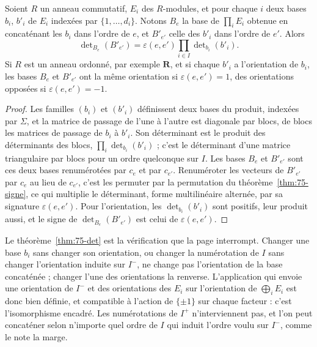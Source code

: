 \begin{encadre}
\begin{theoreme}\label{thm:75-det}
Soient $R$ un anneau commutatif, $E_i$ des $R$-modules, et pour chaque $i$ deux bases $b_i$, $b'_i$ de $E_i$ indexées par $\{1, \ldots, d_i\}$. Notons $B_e$ la base de $\prod_i E_i$ obtenue en concaténant les $b_i$ dans l'ordre de $e$, et $B'_{e'}$ celle des $b'_i$ dans l'ordre de $e'$. Alors
\[
\det\nolimits_{B_e}(B'_{e'}) = \varepsilon(e, e') \prod_{i \in I} \det\nolimits_{b_i}(b'_i) .
\]
Si $R$ est un anneau ordonné, par exemple $\mathbf R$, et si chaque $b'_i$ a l'orientation de $b_i$, les bases $B_e$ et $B'_{e'}$ ont la même orientation si $\varepsilon(e, e') = 1$, des orientations opposées si $\varepsilon(e, e') = -1$.
\end{theoreme}
\end{encadre}

\begin{proof}
Les familles $(b_i)$ et $(b'_i)$ définissent deux bases du produit, indexées par $\Sigma$, et la matrice de passage de l'une à l'autre est diagonale par blocs, de blocs les matrices de passage de $b_i$ à $b'_i$. Son déterminant est le produit des déterminants des blocs, $\prod_i \det_{b_i}(b'_i)$ ; c'est le déterminant d'une matrice triangulaire par blocs pour un ordre quelconque sur $I$. Les bases $B_e$ et $B'_{e'}$ sont ces deux bases renumérotées par $c_e$ et par $c_{e'}$. Renuméroter les vecteurs de $B'_{e'}$ par $c_e$ au lieu de $c_{e'}$, c'est les permuter par la permutation du théorème~\ref{thm:75-signe}, ce qui multiplie le déterminant, forme multilinéaire alternée, par sa signature $\varepsilon(e, e')$. Pour l'orientation, les $\det_{b_i}(b'_i)$ sont positifs, leur produit aussi, et le signe de $\det_{B_e}(B'_{e'})$ est celui de $\varepsilon(e, e')$.
\end{proof}

Le théorème~\ref{thm:75-det} est la vérification que la page interrompt. Changer une base $b_i$ sans changer son orientation, ou changer la numérotation de $I$ sans changer l'orientation induite sur $I^-$, ne change pas l'orientation de la base concaténée ; changer l'une des orientations la renverse. L'application qui envoie une orientation de $I^-$ et des orientations des $E_i$ sur l'orientation de $\bigoplus_i E_i$ est donc bien définie, et compatible à l'action de $\{\pm 1\}$ sur chaque facteur : c'est l'isomorphisme encadré. Les numérotations de $I^+$ n'interviennent pas, et l'on peut concaténer selon n'importe quel ordre de $I$ qui induit l'ordre voulu sur $I^-$, comme le note la marge.

